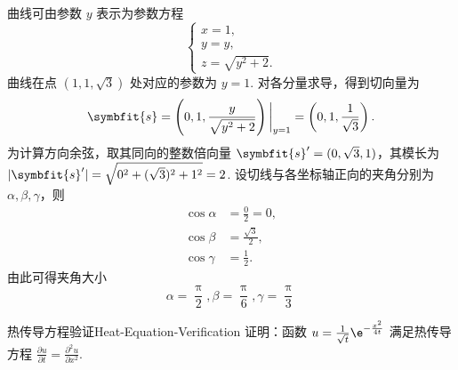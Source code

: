 \begin{solution}
    曲线可由参数 $y$ 表示为参数方程
    \begin{equation}
        \begin{cases}
            x = 1, \\
            y = y, \\
            z = \sqrt{y^2 + 2}.
        \end{cases}
    \end{equation}
    曲线在点 $(1, 1, \sqrt{3})$ 处对应的参数为 $y = 1$. 对各分量求导，得到切向量为
    \begin{equation}
        \symbfit{s} = \left( 0, 1, \frac{y}{\sqrt{y^2 + 2}} \right) \bigg|_{y=1} = \left( 0, 1, \frac{1}{\sqrt{3}} \right).
    \end{equation}
    为计算方向余弦，取其同向的整数倍向量 $\symbfit{s}' = (0, \sqrt{3}, 1)$，其模长为 $|\symbfit{s}'| = \sqrt{0^2 + (\sqrt{3})^2 + 1^2} = 2$.
    设切线与各坐标轴正向的夹角分别为 $\alpha, \beta, \gamma$，则
    \begin{equation}
        \begin{aligned}
            \cos \alpha & = \frac{0}{2} = 0,    \\
            \cos \beta  & = \frac{\sqrt{3}}{2}, \\
            \cos \gamma & = \frac{1}{2}.
        \end{aligned}
    \end{equation}
    由此可得夹角大小
    \begin{equation}
        \boxed{\alpha = \frac{\uppi}{2}, \beta = \frac{\uppi}{6}, \gamma = \frac{\uppi}{3}}
    \end{equation}
\end{solution}

\begin{problem}{热传导方程验证}{Heat-Equation-Verification}
    证明：函数 $u = \frac{1}{\sqrt{t}}\e^{-\frac{x^2}{4t}}$ 满足热传导方程 $\frac{\partial u}{\partial t} = \frac{\partial^2 u}{\partial x^2}$.
\end{problem}

